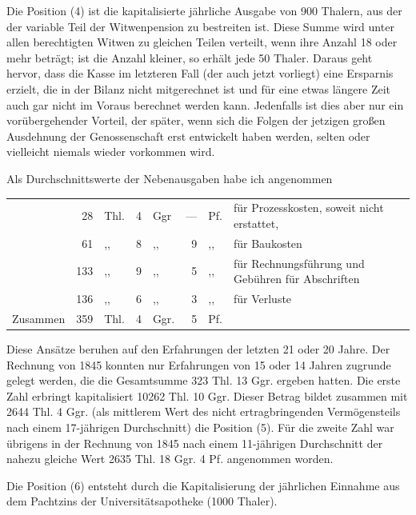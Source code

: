 Die Position (4) ist die kapitalisierte jährliche Ausgabe von 900 Thalern, aus der der variable Teil der Witwenpension zu bestreiten ist. Diese Summe wird unter allen berechtigten Witwen zu gleichen Teilen verteilt, wenn ihre Anzahl 18 oder mehr beträgt; ist die Anzahl kleiner, so erhält jede 50 Thaler. Daraus geht hervor, dass die Kasse im letzteren Fall (der auch jetzt vorliegt) eine Ersparnis erzielt, die in der Bilanz nicht mitgerechnet ist und für eine etwas längere Zeit auch gar nicht im Voraus berechnet werden kann. Jedenfalls ist dies aber nur ein vorübergehender Vorteil, der später, wenn sich die Folgen der jetzigen großen Ausdehnung der Genossenschaft erst entwickelt haben werden, selten oder vielleicht niemals wieder vorkommen wird.

Als Durchschnittswerte der Nebenausgaben habe ich angenommen
\begin{center}
\small\setlength{\tabcolsep}{2pt}
\begin{tabular}{r r l r l r l p{196pt}}
&28&Thl.&4&Ggr&—&Pf.&für Prozesskosten, soweit nicht erstattet,\\
&61&,,&8&,,&9&,,&für Baukosten\\
&133&,,&9&,,&5&,,&für Rechnungsführung und Gebühren für Abschriften\\
&136&,,&6&,,&3&,,&für Verluste\\
Zusammen&359&Thl.&4&Ggr.&5&Pf.&
\end{tabular}
\end{center}
\noindent\hspace*{\parindent}Diese Ansätze beruhen auf den Erfahrungen der letzten 21 oder 20 Jahre. Der Rechnung von 1845 konnten nur Erfahrungen von 15 oder 14 Jahren zugrunde gelegt werden, die die Gesamtsumme 323 Thl. 13 Ggr. ergeben hatten. Die erste Zahl erbringt kapitalisiert 10262 Thl. 10 Ggr. Dieser Betrag bildet zusammen mit 2644 Thl. 4 Ggr. (als mittlerem Wert des nicht ertragbringenden Vermögensteils nach einem 17-jährigen Durchschnitt) die Position (5). Für die zweite Zahl war übrigens in der Rechnung von 1845 nach einem 11-jährigen Durchschnitt der nahezu gleiche Wert 2635 Thl. 18 Ggr. 4 Pf. angenommen worden.

Die Position (6) entsteht durch die Kapitalisierung der jährlichen Einnahme aus dem Pachtzins der Universitätsapotheke (1000 Thaler).
